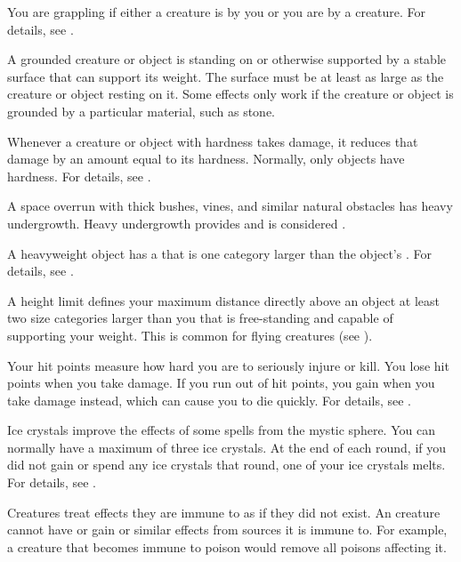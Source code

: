  You are grappling if either a creature is \grappled by you or you are \grappled by a creature.
For details, see .

 A grounded creature or object is standing on or otherwise supported by a stable surface that can support its weight.
The surface must be at least as large as the creature or object resting on it.
Some effects only work if the creature or object is grounded by a particular material, such as stone.

 Whenever a creature or object with hardness takes damage, it reduces that damage by an amount equal to its hardness.
Normally, only objects have hardness.
For details, see .

 A space overrun with thick bushes, vines, and similar natural obstacles has heavy undergrowth.
Heavy undergrowth provides  and is considered .

 A heavyweight object has a  that is one category larger than the object's .
For details, see .

 A height limit defines your maximum distance directly above an object at least two size categories larger than you that is free-standing and capable of supporting your weight.
This is common for flying creatures (see ).

 Your hit points measure how hard you are to seriously injure or kill.
You lose hit points when you take damage.
If you run out of hit points, you gain  when you take damage instead, which can cause you to die quickly.
For details, see .

 Ice crystals improve the effects of some spells from the  mystic sphere.
You can normally have a maximum of three ice crystals.
At the end of each round, if you did not gain or spend any ice crystals that round, one of your ice crystals melts.
For details, see .

 Creatures treat effects they are immune to as if they did not exist.
An creature cannot have or gain  or similar effects from sources it is immune to.
For example, a creature that becomes immune to poison would remove all poisons affecting it.

